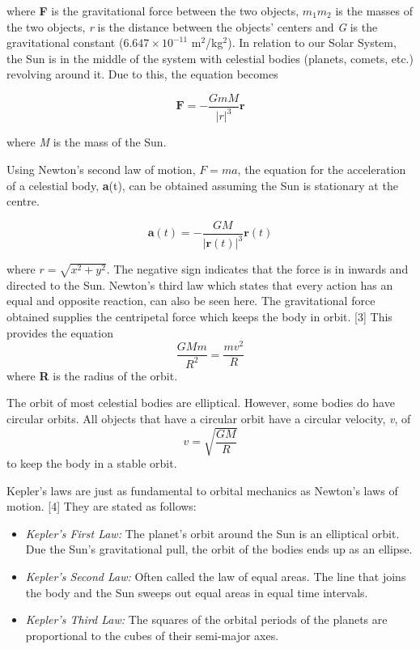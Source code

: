 \documentclass[12 pt, a4paper]{article}
\begin{document}
where \textbf{F} is the gravitational force between the two objects, $m_1m_2$ is the masses of the two objects, \textit{r} is the distance 
between the objects' centers and \textit{G} is the gravitational constant ($6.647 \times 10^{-11}$ m$^2$/kg$^2$). In relation to our Solar 
System, the Sun is in the middle of the system with celestial bodies (planets, comets, etc.) revolving around it. Due to this, the equation 
becomes

\[
\mathbf{F} = -\frac{GmM}{|r|^3}\mathbf{r}
\tag{Eq. 1b}
\]

where \textit{M} is the mass of the Sun.

Using Newton's second law of motion, $F=ma$, the equation for the acceleration of a celestial body, \textbf{a}(t), can be obtained assuming 
the Sun is stationary at the centre.

\[
\mathbf{a}(t) = -\frac{GM}{|\mathbf{r}(t)|^3}\mathbf{r}(t)
\tag{Eq. 2}
\]

where $r = \sqrt{x^2 +y^2}$.
The negative sign indicates that the force is in inwards and directed to the Sun. Newton's third law which states that every action has an 
equal and opposite reaction, can also be seen here. The gravitational force obtained supplies the centripetal force which keeps the body in 
orbit. [3] This provides the equation
\[
\frac{GMm}{R^2} = \frac{mv^2}{R}
\tag{Eq. 3}
\]
where \textbf{R} is the radius of the orbit.

The orbit of most celestial bodies are elliptical. However, some bodies do have circular orbits. All objects that have a circular orbit have a
circular velocity, \textit{v}, of
\[
v = \sqrt{\frac{GM}{R}}
\tag{Eq. 4}
\]
to keep the body in a stable orbit.

Kepler's laws are just as fundamental to orbital mechanics as Newton's laws of motion. [4] They are stated as follows:
\begin{itemize}
    \item \textit{Kepler's First Law:} The planet's orbit around the Sun is an elliptical orbit. Due the Sun's gravitational pull, the orbit of the bodies ends up as an ellipse.
    \item \textit{Kepler's Second Law:} Often called the law of equal areas. The line that joins the body and the Sun sweeps out equal areas in equal time intervals.
    \item \textit{Kepler's Third Law:} The squares of the orbital periods of the planets are proportional to the cubes of their semi-major axes.
\end{itemize}
\end{document}
